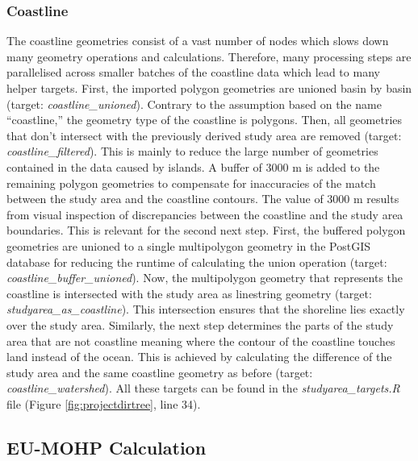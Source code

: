 \documentclass[fleqn,10pt]{wlscirep}
\begin{document}
\hypertarget{coastline}{%
\subsubsection*{Coastline}\label{coastline}}

The coastline geometries consist of a vast number of nodes which slows down many geometry operations and calculations. Therefore, many processing steps are parallelised across smaller batches of the coastline data which lead to many helper targets. First, the imported polygon geometries are unioned basin by basin (target: \emph{coastline\_unioned}). Contrary to the assumption based on the name ``coastline,'' the geometry type of the coastline is polygons. Then, all geometries that don't intersect with the previously derived study area are removed (target: \emph{coastline\_filtered}). This is mainly to reduce the large number of geometries contained in the data caused by islands. A buffer of 3000 m is added to the remaining polygon geometries to compensate for inaccuracies of the match between the study area and the coastline contours. The value of 3000 m results from visual inspection of discrepancies between the coastline and the study area boundaries. This is relevant for the second next step. First, the buffered polygon geometries are unioned to a single multipolygon geometry in the PostGIS database for reducing the runtime of calculating the union operation (target: \emph{coastline\_buffer\_unioned}). Now, the multipolygon geometry that represents the coastline is intersected with the study area as linestring geometry (target: \emph{studyarea\_as\_coastline}). This intersection ensures that the shoreline lies exactly over the study area. Similarly, the next step determines the parts of the study area that are not coastline meaning where the contour of the coastline touches land instead of the ocean. This is achieved by calculating the difference of the study area and the same coastline geometry as before (target: \emph{coastline\_watershed}). All these targets can be found in the \emph{studyarea\_targets.R} file (Figure \ref{fig:projectdirtree}, line 34).

\hypertarget{eu-mohp-calculation}{%
\subsection*{EU-MOHP Calculation}\label{eu-mohp-calculation}}
\end{document}
